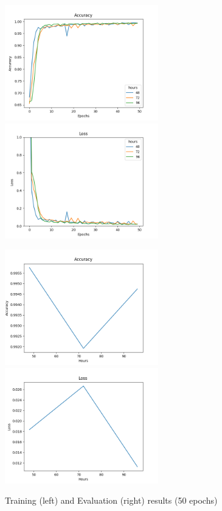 \begin{figure}
      \begin{multicols}{2}
            \includegraphics[height=5cm]{img/control_condition/plot_acc_train_50e.png}
            \includegraphics[height=5cm]{img/control_condition/plot_loss_train_50e.png}

            \includegraphics[height=5cm]{img/control_condition/plot_acc_eval_50e.png}
            \includegraphics[height=5cm]{img/control_condition/plot_loss_eval_50e.png}
      \end{multicols}
      \caption{Training (left) and Evaluation (right) results (50 epochs)}
      \label{figure:control_condition_50e}
\end{figure}

